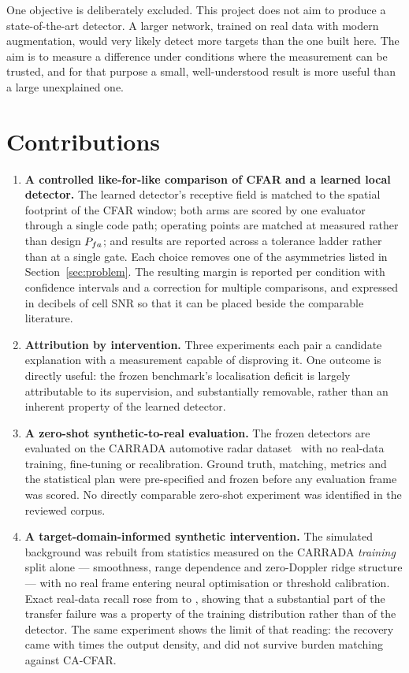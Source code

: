 One objective is deliberately excluded. This project does not aim to produce a state-of-the-art
detector. A larger network, trained on real data with modern augmentation, would very likely detect
more targets than the one built here. The aim is to measure a difference under conditions where the
measurement can be trusted, and for that purpose a small, well-understood result is more useful than
a large unexplained one.

\section{Contributions}

\begin{enumerate}
\itemsep5pt
\item \textbf{A controlled like-for-like comparison of CFAR and a learned local detector.} The
learned detector's receptive field is matched to the spatial footprint of the CFAR window; both arms
are scored by one evaluator through a single code path; operating points are matched at measured
rather than design $P_{fa}$; and results are reported across a tolerance ladder rather than at a
single gate. Each choice removes one of the asymmetries listed in Section~\ref{sec:problem}. The
resulting margin is reported per condition with confidence intervals and a correction for multiple
comparisons, and expressed in decibels of cell SNR so that it can be placed beside the comparable
literature.

\item \textbf{Attribution by intervention.} Three experiments each pair a candidate explanation with
a measurement capable of disproving it. One outcome is directly useful: the frozen benchmark's
localisation deficit is largely attributable to its supervision, and substantially removable, rather
than an inherent property of the learned detector.

\item \textbf{A zero-shot synthetic-to-real evaluation.} The frozen detectors are evaluated on the
CARRADA automotive radar dataset~\cite{ouaknine2021carrada} with no real-data training, fine-tuning
or recalibration. Ground truth, matching, metrics and the statistical plan were pre-specified and
frozen before any evaluation frame was scored. No directly comparable zero-shot experiment was
identified in the reviewed corpus.

\item \textbf{A target-domain-informed synthetic intervention.} The simulated background was rebuilt
from statistics measured on the CARRADA \emph{training} split alone --- smoothness, range dependence
and zero-Doppler ridge structure --- with no real frame entering neural optimisation or threshold
calibration. Exact real-data recall rose from \CiTestOrig{} to \CiTestNew{}, showing that a
substantial part of the transfer failure was a property of the training distribution rather than of
the detector. The same experiment shows the limit of that reading: the recovery came with
\CiTestBurdenRatio{} times the output density, and did not survive burden matching against CA-CFAR.


\end{enumerate}
